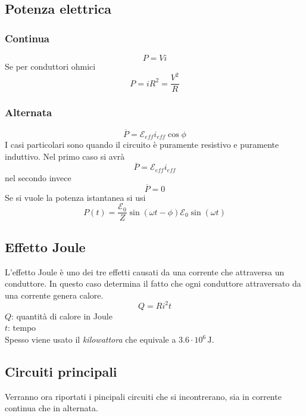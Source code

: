 \subsection{Potenza elettrica}
\subsubsection{Continua}
\begin{equation*}
P = Vi
\end{equation*}
Se per conduttori ohmici
\begin{equation*}
P = iR^2 = \frac{V^2}{R}
\end{equation*}
\subsubsection{Alternata}
\begin{equation*}
  \overline{P} = \mathcal{E}_{eff}i_{eff}\cos\phi
\end{equation*}
I casi particolari sono quando il circuito è puramente resistivo e puramente induttivo. Nel primo
caso si avrà
\begin{equation*}
  \overline{P} = \mathcal{E}_{eff}i_{eff}
\end{equation*}
nel secondo invece
\begin{equation*}
  \overline{P} = 0
\end{equation*}
Se si vuole la potenza istantanea si usi
\begin{equation*}
  P(t) = \frac{\mathcal{E}_0}{Z}\sin(\omega t - \phi) \mathcal{E}_0\sin(\omega t) 
\end{equation*}

\subsection{Effetto Joule}
L'effetto Joule è uno dei tre effetti causati da una corrente che attraversa un conduttore. 
In questo caso determina il fatto che ogni conduttore attraversato da una corrente genera calore.
\begin{equation*}
Q = Ri^2t
\end{equation*}
$Q$: quantità di calore in Joule\\
$t$: tempo\\ [\baselineskip]

Spesso viene usato il \emph{kilowattora} che equivale a $3.6\cdot10^6\,\text{J}$.

\subsection{Circuiti principali}
Verranno ora riportati i pincipali circuiti che si incontrerano, sia in corrente continua che in
alternata.

